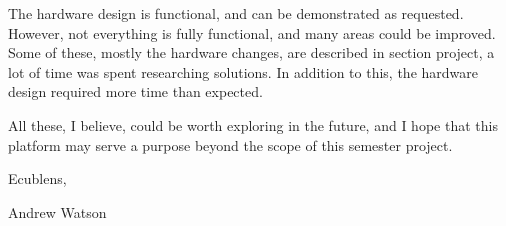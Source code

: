 The hardware design is functional, and can be demonstrated as requested.
However, not everything is fully functional, and many areas could be improved.
Some of these, mostly the hardware changes, are described in section
project, a lot of time was spent researching solutions. In addition to this, the
hardware design required more time than expected.

All these, I believe, could be worth exploring in the future, and I hope that
this platform may serve a purpose beyond the scope of this semester project.

\vspace{3cm}
Ecublens, \thedate

\vspace{2cm}
Andrew Watson
